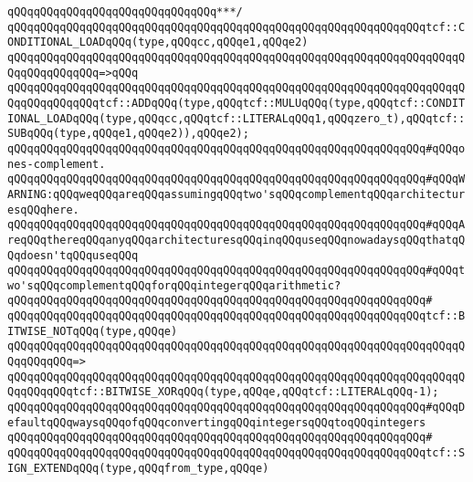 \verb|qQQqqQQqqQQqqQQqqQQqqQQqqQQqqQQq***/|\newline
\newline
\verb|qQQqqQQqqQQqqQQqqQQqqQQqqQQqqQQqqQQqqQQqqQQqqQQqqQQqqQQqqQQqqQQqtcf::CONDITIONAL_LOADqQQq(type,qQQqcc,qQQqe1,qQQqe2)|\newline
\verb|qQQqqQQqqQQqqQQqqQQqqQQqqQQqqQQqqQQqqQQqqQQqqQQqqQQqqQQqqQQqqQQqqQQqqQQqqQQqqQQqqQQq=>qQQq|\newline
\verb|qQQqqQQqqQQqqQQqqQQqqQQqqQQqqQQqqQQqqQQqqQQqqQQqqQQqqQQqqQQqqQQqqQQqqQQqqQQqqQQqqQQqtcf::ADDqQQq(type,qQQqtcf::MULUqQQq(type,qQQqtcf::CONDITIONAL_LOADqQQq(type,qQQqcc,qQQqtcf::LITERALqQQq1,qQQqzero_t),qQQqtcf::SUBqQQq(type,qQQqe1,qQQqe2)),qQQqe2);|\newline
\newline
\verb|qQQqqQQqqQQqqQQqqQQqqQQqqQQqqQQqqQQqqQQqqQQqqQQqqQQqqQQqqQQqqQQq#qQQqones-complement.|\newline
\verb|qQQqqQQqqQQqqQQqqQQqqQQqqQQqqQQqqQQqqQQqqQQqqQQqqQQqqQQqqQQqqQQq#qQQqWARNING:qQQqweqQQqareqQQqassumingqQQqtwo'sqQQqcomplementqQQqarchitecturesqQQqhere.|\newline
\verb|qQQqqQQqqQQqqQQqqQQqqQQqqQQqqQQqqQQqqQQqqQQqqQQqqQQqqQQqqQQqqQQq#qQQqAreqQQqthereqQQqanyqQQqarchitecturesqQQqinqQQquseqQQqnowadaysqQQqthatqQQqdoesn'tqQQquseqQQq|\newline
\verb|qQQqqQQqqQQqqQQqqQQqqQQqqQQqqQQqqQQqqQQqqQQqqQQqqQQqqQQqqQQqqQQq#qQQqtwo'sqQQqcomplementqQQqforqQQqintegerqQQqarithmetic?|\newline
\verb|qQQqqQQqqQQqqQQqqQQqqQQqqQQqqQQqqQQqqQQqqQQqqQQqqQQqqQQqqQQqqQQq#|\newline
\verb|qQQqqQQqqQQqqQQqqQQqqQQqqQQqqQQqqQQqqQQqqQQqqQQqqQQqqQQqqQQqqQQqtcf::BITWISE_NOTqQQq(type,qQQqe)|\newline
\verb|qQQqqQQqqQQqqQQqqQQqqQQqqQQqqQQqqQQqqQQqqQQqqQQqqQQqqQQqqQQqqQQqqQQqqQQqqQQqqQQq=>|\newline
\verb|qQQqqQQqqQQqqQQqqQQqqQQqqQQqqQQqqQQqqQQqqQQqqQQqqQQqqQQqqQQqqQQqqQQqqQQqqQQqqQQqtcf::BITWISE_XORqQQq(type,qQQqe,qQQqtcf::LITERALqQQq-1);|\newline
\newline
\newline
\verb|qQQqqQQqqQQqqQQqqQQqqQQqqQQqqQQqqQQqqQQqqQQqqQQqqQQqqQQqqQQqqQQq#qQQqDefaultqQQqwaysqQQqofqQQqconvertingqQQqintegersqQQqtoqQQqintegers|\newline
\verb|qQQqqQQqqQQqqQQqqQQqqQQqqQQqqQQqqQQqqQQqqQQqqQQqqQQqqQQqqQQqqQQq#|\newline
\verb|qQQqqQQqqQQqqQQqqQQqqQQqqQQqqQQqqQQqqQQqqQQqqQQqqQQqqQQqqQQqqQQqtcf::SIGN_EXTENDqQQq(type,qQQqfrom_type,qQQqe)|\newline
